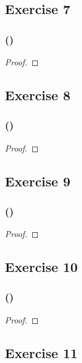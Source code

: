 \documentclass[14pt]{extarticle}
\begin{document}
\subsection{Exercise 7}

\subsubsection{()}

\begin{proof}

\end{proof}

\subsection{Exercise 8}

\subsubsection{()}

\begin{proof}

\end{proof}

\subsection{Exercise 9}

\subsubsection{()}

\begin{proof}

\end{proof}

\subsection{Exercise 10}

\subsubsection{()}

\begin{proof}

\end{proof}

\subsection{Exercise 11}
\end{document}
